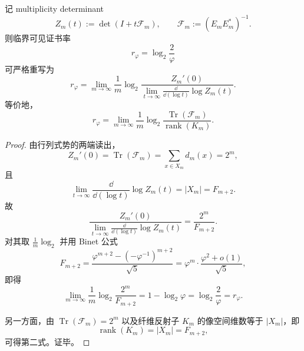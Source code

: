 \begin{theorem}[临界可见证书率是同一行列式势的端点缺口]\label{thm:conclusion-fold-audit-visible-witness-determinant-endpoint-gap}
记 multiplicity determinant
\[
Z_m(t):=\det(I+t\mathcal F_m),
\qquad
\mathcal F_m:=(E_mE_m^\ast)^{-1}.
\]
则临界可见证书率
\[
r_\varphi=\log_2\frac{2}{\varphi}
\]
可严格重写为
\[
r_\varphi=
\lim_{m\to\infty}
\frac1m
\log_2
\frac{Z_m'(0)}
{\displaystyle \lim_{t\to\infty}\frac{\dd}{\dd(\log t)}\log Z_m(t)}.
\]
等价地，
\[
r_\varphi=
\lim_{m\to\infty}
\frac1m\log_2\frac{\operatorname{Tr}(\mathcal F_m)}{\operatorname{rank}(K_m)}.
\]
\end{theorem}
\begin{proof}
由行列式势的两端读出，
\[
Z_m'(0)=\operatorname{Tr}(\mathcal F_m)=\sum_{x\in X_m}d_m(x)=2^m,
\]
且
\[
\lim_{t\to\infty}\frac{\dd}{\dd(\log t)}\log Z_m(t)=|X_m|=F_{m+2}.
\]
故
\[
\frac{Z_m'(0)}
{\displaystyle \lim_{t\to\infty}\frac{\dd}{\dd(\log t)}\log Z_m(t)}
=
\frac{2^m}{F_{m+2}}.
\]
对其取 \(\frac1m\log_2\) 并用 Binet 公式
\[
F_{m+2}=\frac{\varphi^{m+2}-(-\varphi^{-1})^{m+2}}{\sqrt5}
=
\varphi^m\cdot\frac{\varphi^2+o(1)}{\sqrt5},
\]
即得
\[
\lim_{m\to\infty}\frac1m\log_2\frac{2^m}{F_{m+2}}
=
1-\log_2\varphi
=
\log_2\frac2\varphi
=
r_\varphi.
\]

另一方面，由 \(\operatorname{Tr}(\mathcal F_m)=2^m\) 以及纤维反射子 \(K_m\) 的像空间维数等于 \(|X_m|\)，即
\[
\operatorname{rank}(K_m)=|X_m|=F_{m+2},
\]
可得第二式。证毕。
\end{proof}

